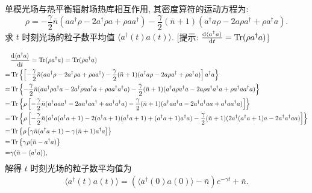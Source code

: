 \documentclass{assignment}
\begin{document}
\begin{prob}
    单模光场与热平衡辐射场热库相互作用, 其密度算符的运动方程为:
    \[
        \rho=-\frac{\gamma}{2}\bar{n}(aa^{\dagger}\rho-2a^{\dagger}\rho a+\rho aa^{\dagger})-\frac{\gamma}{2}(\bar{n}+1)(a^{\dagger}a\rho-2a\rho a^{\dagger}+\rho a^{\dagger}a).
    \]
    求 $t$ 时刻光场的粒子数平均值 $\langle a^{\dagger}(t)a(t)\rangle$. [提示: $\frac{\mathrm{d}\langle a^{\dagger}a\rangle}{\mathrm{d}t}=\operatorname{Tr}(\rho a^{\dagger}a)$]
\end{prob}
\begin{sol}
    \begin{align}
        \notag&\frac{\mathrm{d}\langle a^{\dagger}a\rangle}{\mathrm{d}t}=\operatorname{Tr}(\rho a^{\dagger}a)=\operatorname{Tr}(\dot{\rho}a^{\dagger}a)\\
        \notag=&\operatorname{Tr}\left\{\left[-\frac{\gamma}{2}\bar{n}(aa^{\dagger}\rho-2a^{\dagger}\rho a+\rho aa^{\dagger})-\frac{\gamma}{2}(\bar{n}+1)(a^{\dagger}a\rho-2a\rho a^{\dagger}+\rho a^{\dagger}a)\right]a^{\dagger}a\right\}\\
        \notag=&\operatorname{Tr}\left\{-\frac{\gamma}{2}\bar{n}(aa^{\dagger}\rho a^{\dagger}a-2a^{\dagger}\rho aa^{\dagger}a+\rho aa^{\dagger}a^{\dagger}a)-\frac{\gamma}{2}(\bar{n}+1)(a^{\dagger}a\rho a^{\dagger}a-2a\rho a^{\dagger}a^{\dagger}a+\rho a^{\dagger}aa^{\dagger}a)\right\}\\
        \notag=&\operatorname{Tr}\left\{\rho\left[-\frac{\gamma}{2}\bar{n}(a^{\dagger}aaa^{\dagger}-2aa^{\dagger}aa^{\dagger}+aa^{\dagger}a^{\dagger}a)-\frac{\gamma}{2}(\bar{n}+1)(a^{\dagger}aa^{\dagger}a-2a^{\dagger}a^{\dagger}aa+a^{\dagger}aa^{\dagger}a)\right]\right\}\\
        \notag=&\operatorname{Tr}\left\{\rho\left[-\frac{\gamma}{2}\bar{n}(a^{\dagger}a(a^{\dagger}a+1)-2(a^{\dagger}a+1)(a^{\dagger}a+1)+(a^{\dagger}a+1)a^{\dagger}a)-\frac{\gamma}{2}(\bar{n}+1)(2a^{\dagger}(a^{\dagger}a+1)a-2a^{\dagger}a^{\dagger}aa)\right]\right\}\\
        \notag=&\operatorname{Tr}\left\{\rho\left[\gamma\bar{n}(a^{\dagger}a+1)-\gamma(\bar{n}+1)a^{\dagger}a\right]\right\}\\
        \notag=&\operatorname{Tr}\left\{\gamma\rho(\bar{n}-a^{\dagger}a)\right\}\\
        =&\gamma(\bar{n}-\langle a^{\dagger}a\rangle),
    \end{align}
    解得 $t$ 时刻光场的粒子数平均值为
    \begin{align}
        \langle a^{\dagger}(t)a(t)\rangle=(\langle a^{\dagger}(0)a(0)\rangle-\bar{n})e^{-\gamma t}+\bar{n}.
    \end{align}
\end{sol}
\end{document}
